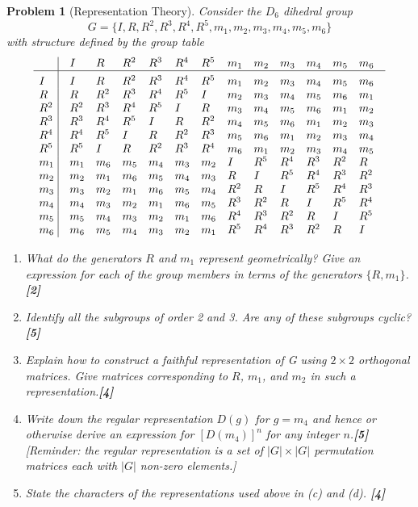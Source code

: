 \documentclass[a4paper]{article}
\theoremstyle{new}
\newtheorem{qns}{Problem}[section]
\begin{document}
\newpage
\begin{qns}[Representation Theory]
Consider the $D_6$ dihedral group
$$G=\{I,R,R^2,R^3,R^4,R^5,m_1,m_2,m_3,m_4,m_5,m_6\}$$
with structure defined by the group table
$$\vbox{\tabskip0.5em\offinterlineskip
    \halign{\strut$#$\hfil\ \tabskip1em\vrule&&$#$\hfil\cr
    ~   & I   & R   & R^2 & R^3 &R^4 & R^5 & m_1& m_2&m_3 & m_4&m_5& m_6    \cr
    \noalign{\hrule}\vrule height 12pt width 0pt
     I & I   & R   & R^2 & R^3 &R^4 & R^5 & m_1& m_2&m_3 & m_4&m_5& m_6    \cr
     R & R  & R^2   & R^3 & R^4 &R^5 & I & m_2& m_3&m_4 & m_5&m_6& m_1    \cr
     R^2 & R^2  & R^3   & R^4 & R^5 &I & R & m_3& m_4&m_5 & m_6&m_1& m_2    \cr
     R^3 & R^3  & R^4   & R^5 & I &R & R^2 & m_4& m_5&m_6 & m_1&m_2& m_3    \cr
     R^4 & R^4  & R^5   & I & R &R^2 & R^3 & m_5& m_6&m_1 & m_2&m_3& m_4    \cr
     R^5 & R^5  & I   & R & R^2 &R^3 & R^4 & m_6& m_1&m_2 & m_3&m_4& m_5    \cr
     m_1 & m_1  & m_6   & m_5 & m_4 & m_3 & m_2 & I& R^5&R^4 & R^3&R^2& R    \cr
     m_2  &m_2 & m_1   & m_6 & m_5 &m_4 & m_3 & R& I&R^5 & R^4 &R^3& R^2    \cr
     m_3  &m_3  & m_2   & m_1 & m_6 &m_5 & m_4 & R^2& R&I & R^5&R^4& R^3    \cr
     m_4  &m_4 & m_3   & m_2 & m_1 &m_6 & m_5 & R^3& R^2&R & I&R^5& R^4    \cr
     m_5  &m_5 & m_4   & m_3 & m_2 &m_1 & m_6 & R^4& R^3&R^2 & R&I& R^5    \cr
     m_6  &m_6  & m_5   & m_4 & m_3 &m_2 & m_1 & R^5& R^4&R^3 & R^2&R& I    \cr
}}$$
\begin{enumerate}[label=(\alph*)]
\item What do the generators $R$ and $m_1$ represent geometrically? Give an expression for each of the group members in terms of the generators $\{R,m_1\}$.\hfill\textbf{[2]}
\item Identify all the subgroups of order 2 and 3. Are any of these subgroups cyclic? \hfill\textbf{[5]}
\item Explain how to construct a faithful representation of G using $2\times 2$ orthogonal matrices. Give matrices corresponding to $R$, $m_1$, and $m_2$ in such a representation.\hfill\textbf{[4]}
\item Write down the regular representation $D(g)$ for $g = m_4$ and hence or otherwise derive an expression for $[D(m_4)]^n$ for any integer $n$.\hfill\textbf{[5]}\\[5pt]
[Reminder: the regular representation is a set of $|G|\times|G|$ permutation matrices each with $|G|$ non-zero elements.]
\item State the characters of the representations used above in (c) and (d). \hfill\textbf{[4]}
\end{enumerate}
\end{qns}
\end{document}
